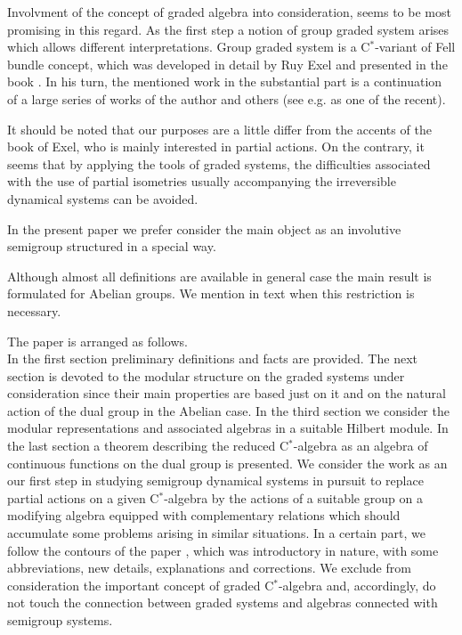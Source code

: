 \documentclass[
11pt,%
tightenlines,%
twoside,%
onecolumn,%
nofloats,%
nobibnotes,%
nofootinbib,%
superscriptaddress,%
noshowpacs,%
centertags]%
{revtex4}
\begin{document}
\medskip
\noindent Involvment of the concept of graded algebra into consideration, seems to be most promising in this regard.
As the first step a notion of group graded system arises which allows different interpretations.
Group graded system is a C$^*$-variant of  Fell bundle concept, which was developed in detail by Ruy Exel and presented in the book \cite{E}.
In his turn, the mentioned work in the substantial part is a continuation of a large series of works of the author and others (see e.g. \cite{BE} as one of the recent).

It should be noted that our purposes are a little differ from the accents of the book of Exel, who is mainly interested in partial actions.
On the contrary, it seems that by applying the tools of graded systems, the difficulties associated with the use of partial isometries usually
accompanying the irreversible
dynamical systems can be avoided.

In the present paper we prefer consider the main object as an involutive semigroup structured in a special way.

Although almost all definitions are available in general case the main result is formulated for Abelian groups. We mention in text when this restriction is necessary.

The paper is arranged as follows.\\
In the first section preliminary definitions and facts are provided. The  next section is  devoted to the modular structure on the graded systems under consideration since their main properties are based just on it and on the natural action of the dual group in the Abelian case. In the third section we consider the modular   representations and associated algebras in a suitable Hilbert module.
In  the last section a theorem describing the reduced C$^*$-algebra as  an algebra of continuous  functions on the dual group is presented.
We consider the work as an our first step in studying semigroup dynamical systems in pursuit to replace partial actions on a given C$^*$-algebra by the actions
of a suitable group on a modifying algebra equipped with complementary relations which should accumulate some problems arising in similar situations.
In a certain part, we follow the contours of the paper \cite{AG}, which was introductory in nature, with some abbreviations, new details, explanations and corrections.
We exclude from consideration the important concept of graded C$^*$-algebra and, accordingly, do not touch the connection between graded systems and algebras
connected with semigroup systems.
\end{document}
